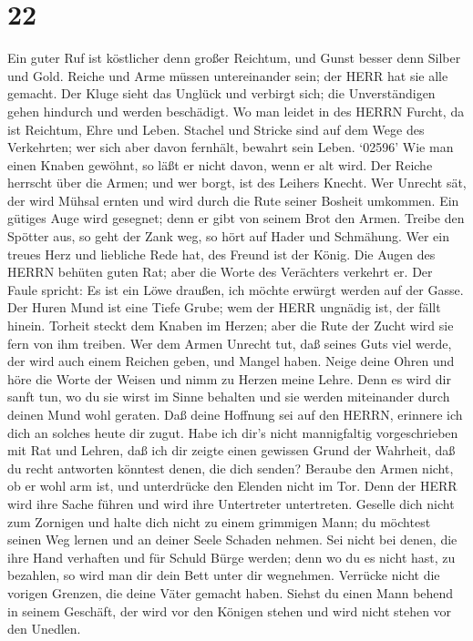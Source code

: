 \hypertarget{section-21}{%
\section{22}\label{section-21}}

 Ein guter Ruf ist köstlicher denn großer Reichtum, und
Gunst besser denn Silber und Gold.  Reiche und Arme müssen
untereinander sein; der HERR hat sie alle gemacht.  Der
Kluge sieht das Unglück und verbirgt sich; die Unverständigen gehen
hindurch und werden beschädigt.  Wo man leidet in des HERRN
Furcht, da ist Reichtum, Ehre und Leben.  Stachel und
Stricke sind auf dem Wege des Verkehrten; wer sich aber davon fernhält,
bewahrt sein Leben.  `02596' Wie man einen Knaben gewöhnt,
so läßt er nicht davon, wenn er alt wird.  Der Reiche
herrscht über die Armen; und wer borgt, ist des Leihers Knecht.
 Wer Unrecht sät, der wird Mühsal ernten und wird durch die
Rute seiner Bosheit umkommen.  Ein gütiges Auge wird
gesegnet; denn er gibt von seinem Brot den Armen.  Treibe
den Spötter aus, so geht der Zank weg, so hört auf Hader und Schmähung.
 Wer ein treues Herz und liebliche Rede hat, des Freund ist
der König.  Die Augen des HERRN behüten guten Rat; aber die
Worte des Verächters verkehrt er.  Der Faule spricht: Es
ist ein Löwe draußen, ich möchte erwürgt werden auf der Gasse.
 Der Huren Mund ist eine Tiefe Grube; wem der HERR ungnädig
ist, der fällt hinein.  Torheit steckt dem Knaben im
Herzen; aber die Rute der Zucht wird sie fern von ihm treiben.
 Wer dem Armen Unrecht tut, daß seines Guts viel werde, der
wird auch einem Reichen geben, und Mangel haben.  Neige
deine Ohren und höre die Worte der Weisen und nimm zu Herzen meine
Lehre.  Denn es wird dir sanft tun, wo du sie wirst im
Sinne behalten und sie werden miteinander durch deinen Mund wohl
geraten.  Daß deine Hoffnung sei auf den HERRN, erinnere
ich dich an solches heute dir zugut.  Habe ich dir's nicht
mannigfaltig vorgeschrieben mit Rat und Lehren,  daß ich
dir zeigte einen gewissen Grund der Wahrheit, daß du recht antworten
könntest denen, die dich senden?  Beraube den Armen nicht,
ob er wohl arm ist, und unterdrücke den Elenden nicht im Tor.
 Denn der HERR wird ihre Sache führen und wird ihre
Untertreter untertreten.  Geselle dich nicht zum Zornigen
und halte dich nicht zu einem grimmigen Mann;  du möchtest
seinen Weg lernen und an deiner Seele Schaden nehmen.  Sei
nicht bei denen, die ihre Hand verhaften und für Schuld Bürge werden;
 denn wo du es nicht hast, zu bezahlen, so wird man dir
dein Bett unter dir wegnehmen.  Verrücke nicht die vorigen
Grenzen, die deine Väter gemacht haben.  Siehst du einen
Mann behend in seinem Geschäft, der wird vor den Königen stehen und wird
nicht stehen vor den Unedlen.

